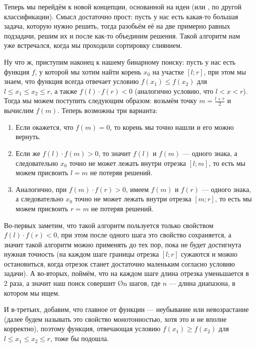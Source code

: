 Теперь мы перейдём к новой концепции, основанной на идеи  (или , по другой классификации). Смысл достаточно прост: пусть у нас есть какая-то большая задача, которую нужно решить, тогда разобьём её на две примерно равных подзадачи, решим их и после как-то объединим решения. Такой алгоритм нам уже встречался, когда мы проходили сортировку слиянием.

Ну что ж, приступим наконец к нашему бинарному поиску: пусть у нас есть функция $f$, у которой мы хотим найти корень $x_0$ на участке $[l;r]$, при этом мы знаем, что функция всегда отвечает условию $f(x_1) \leq f(x_2)$ для $l \leq x_1 \leq x_2 \leq r$, а также $f(l) \cdot f(r) < 0$ (аналогично условию, что $l < x < r$). Тогда мы можем поступить следующим образом: возьмём точку $m = \frac{l + r}{2}$ и вычислим $f(m)$. Теперь возможны три варианта:

\begin{enumerate}
    \item Если окажется, что $f(m) = 0$, то корень мы точно нашли и его можно вернуть.
    \item Если же $f(l) \cdot f(m) > 0$, то значит $f(l)$ и $f(m)$ — одного знака, а следовательно $x_0$ точно не может лежать внутри отрезка $[l;m]$, то есть мы можем присвоить $l = m$ не потеряв решений.
    \item Аналогично, при $f(m) \cdot f(r) > 0$, имеем $f(m)$ и $f(r)$ — одного знака, а следовательно $x_0$ точно не может лежать внутри отрезка $[m;r]$, то есть мы можем присвоить $r = m$ не потеряв решений.
\end{enumerate}

Во-первых заметим, что такой алгоритм пользуется только свойством $f(l) \cdot f(r) < 0$, при этом после одного шага это свойство сохраняется, а значит такой алгоритм можно применять до тех пор, пока не будет достигнута нужная точность (на каждом шаге границы отрезка $[l;r]$ сужаются и можно остановиться, когда отрезок станет достаточно маленьким согласно условию задачи). А во-вторых, поймём, что на каждом шаге длина отрезка уменьшается в 2 раза, а значит наш поиск совершит \O{\log n} шагов, где $n$ — длина диапазона, в котором мы ищем.

И в-третьих, добавим, что главное от функции — неубывание или невозрастание (далее будем называть это свойство монотонностью, хотя это и не вполне корректно), поэтому функция, отвечающая условию $f(x_1) \geq f(x_2)$ для $l \leq x_1 \leq x_2 \leq r$, тоже бы подошла.


